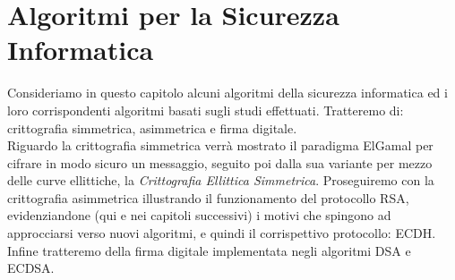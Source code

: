 \documentclass[a4paper,12pt]{tesiinfo}
\begin{document}
%
%
%
%
%
%
%
%
%
%
%
%
%
%
%
%
%
%
%
%
%
%
%
\chapter{Algoritmi per la Sicurezza Informatica}
\label{ecc algo}
Consideriamo in questo capitolo alcuni algoritmi della sicurezza informatica ed i loro corrispondenti algoritmi basati sugli studi effettuati. Tratteremo di: crittografia simmetrica, asimmetrica e firma digitale.
\\
Riguardo la crittografia simmetrica verr\`a mostrato il paradigma ElGamal per cifrare in modo sicuro un messaggio, seguito poi dalla sua variante per mezzo delle curve ellittiche, la \textit{Crittografia Ellittica Simmetrica}. Proseguiremo con la crittografia asimmetrica illustrando il funzionamento del protocollo RSA, evidenziandone (qui e nei capitoli successivi) i motivi che spingono ad approcciarsi verso nuovi algoritmi, e quindi il corrispettivo protocollo: ECDH. Infine tratteremo della firma digitale implementata negli algoritmi DSA e ECDSA.
%
%
%
%
%
%
%
%
%
%
%
%
\end{document}
